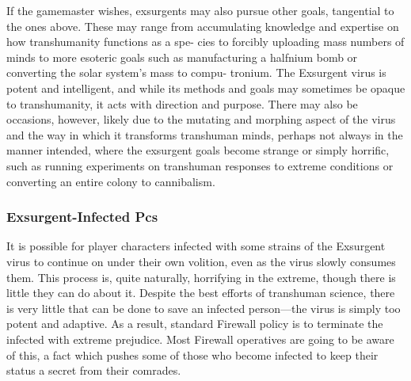 If the gamemaster wishes, exsurgents may also 
pursue other goals, tangential to the ones above. 
These may range from accumulating knowledge and 
expertise on how transhumanity functions as a spe-
cies to forcibly uploading mass numbers of minds to 
more esoteric goals such as manufacturing a halfnium 
bomb or converting the solar system's mass to compu-
tronium. The Exsurgent virus is potent and intelligent, 
and while its methods and goals may sometimes be 
opaque to transhumanity, it acts with direction and 
purpose. There may also be occasions, however, likely 
due to the mutating and morphing aspect of the virus 
and the way in which it transforms transhuman 
minds, perhaps not always in the manner intended, 
where the exsurgent goals become strange or simply 
horrific, such as running experiments on transhuman 
responses to extreme conditions or converting an 
entire colony to cannibalism.

\subsubsection{Exsurgent-Infected Pcs}

It is possible for player characters infected with some 
strains of the Exsurgent virus to continue on under 
their own volition, even as the virus slowly consumes 
them. This process is, quite naturally, horrifying in the 
extreme, though there is little they can do about it. 
Despite the best efforts of transhuman science, there 
is very little that can be done to save an infected 
person—the virus is simply too potent and adaptive. 
As a result, standard Firewall policy is to terminate 
the infected with extreme prejudice. Most Firewall 
operatives are going to be aware of this, a fact which 
pushes some of those who become infected to keep 
their status a secret from their comrades.

